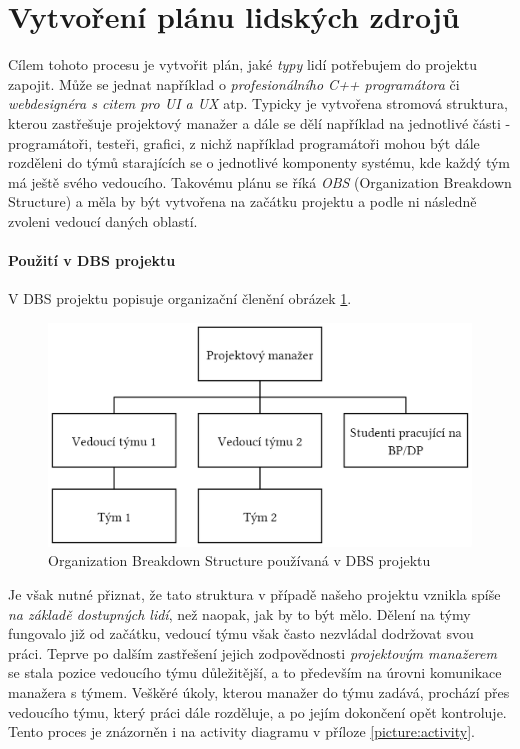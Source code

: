 
\section{Vytvoření plánu lidských zdrojů}

Cílem tohoto procesu je vytvořit plán, jaké \emph{typy} lidí potřebujem do projektu zapojit. Může se jednat například o \emph{profesionálního C++ programátora} či \emph{webdesignéra s citem pro UI a UX} atp. Typicky je vytvořena stromová struktura, kterou zastřešuje projektový manažer a dále se dělí například na jednotlivé části - programátoři, testeři, grafici, z nichž například programátoři mohou být dále rozděleni do týmů starajících se o jednotlivé komponenty systému, kde každý tým má ještě svého vedoucího. Takovému plánu se říká \emph{OBS} (Organization Breakdown Structure) a měla by být vytvořena na začátku projektu a podle ni následně zvoleni vedoucí daných oblastí.

\paragraph{Použití v DBS projektu}
V DBS projektu popisuje organizační členění obrázek \ref{picture:obs}.
\begin{figure}[h]
\includegraphics[width=\textwidth]{../pdf/dbs-obs.pdf}
\caption{Organization Breakdown Structure používaná v DBS projektu} \label{picture:obs}
\end{figure}
Je však nutné přiznat, že tato struktura v případě našeho projektu vznikla spíše \emph{na základě dostupných lidí}, než naopak, jak by to být mělo. Dělení na týmy fungovalo již od začátku, vedoucí týmu však často nezvládal dodržovat svou práci. Teprve po dalším zastřešení jejich zodpovědnosti \emph{projektovým manažerem} se stala pozice vedoucího týmu důležitější, a to především na úrovni komunikace manažera s týmem. Veškěré úkoly, kterou manažer do týmu zadává, prochází přes vedoucího týmu, který práci dále rozděluje, a po jejím dokončení opět kontroluje. Tento proces je znázorněn i na activity diagramu v příloze \ref{picture:activity}.

